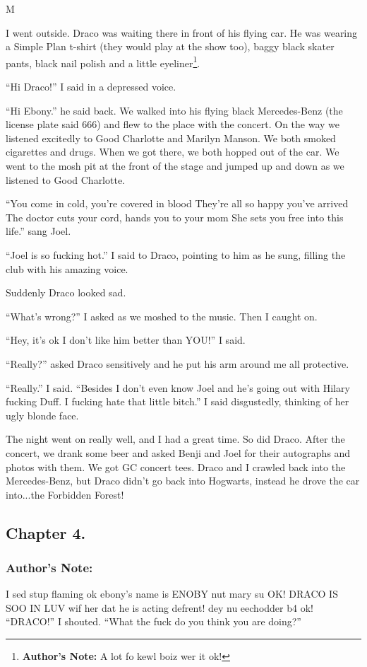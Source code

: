 M\documentclass{article}
\begin{document}
I went outside. Draco was waiting there in front of his flying car. He was wearing a Simple Plan t-shirt (they would play at the show too), baggy black skater pants, black nail polish and a little eyeliner\footnote{\textbf{Author's Note: }A lot fo kewl boiz wer it ok!}.

“Hi Draco!” I said in a depressed voice.

“Hi Ebony.” he said back. We walked into his flying black Mercedes-Benz (the license plate said 666) and flew to the place with the concert. On the way we listened excitedly to Good Charlotte and Marilyn Manson. We both smoked cigarettes and drugs. When we got there, we both hopped out of the car. We went to the mosh pit at the front of the stage and jumped up and down as we listened to Good Charlotte.

“You come in cold, you're covered in blood
They're all so happy you've arrived
The doctor cuts your cord, hands you to your mom
She sets you free into this life.” sang Joel.

“Joel is so fucking hot.” I said to Draco, pointing to him as he sung, filling the club with his amazing voice.

Suddenly Draco looked sad.

“What’s wrong?” I asked as we moshed to the music. Then I caught on.

“Hey, it’s ok I don’t like him better than YOU!” I said.

“Really?” asked Draco sensitively and he put his arm around me all protective.

“Really.” I said. “Besides I don’t even know Joel and he’s going out with Hilary fucking Duff. I fucking hate that little bitch.” I said disgustedly, thinking of her ugly blonde face.

The night went on really well, and I had a great time. So did Draco. After the concert, we drank some beer and asked Benji and Joel for their autographs and photos with them. We got GC concert tees. Draco and I crawled back into the Mercedes-Benz, but Draco didn’t go back into Hogwarts, instead he drove the car into...the Forbidden Forest!
\clearpage
\nolinenumbers
\subsection*{Chapter 4.}

\subsubsection*{Author's Note:} I sed stup flaming ok ebony’s name is ENOBY nut mary su OK! DRACO IS SOO IN LUV wif her dat he is acting defrent! dey nu eechodder b4 ok!
\textbreak
\linenumbers\resetlinenumber
“DRACO!” I shouted. “What the fuck do you think you are doing?”
\end{document}
